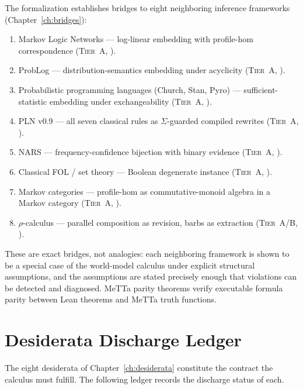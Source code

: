 The formalization establishes bridges to eight neighboring inference
frameworks (Chapter~\ref{ch:bridges}):
\begin{enumerate}
\item Markov Logic Networks --- log-linear embedding with profile-hom
  correspondence (\textsc{Tier~A}, \claimCore{}).
\item ProbLog --- distribution-semantics embedding under acyclicity
  (\textsc{Tier~A}, \claimConditional{}).
\item Probabilistic programming languages (Church, Stan, Pyro) ---
  sufficient-statistic embedding under exchangeability
  (\textsc{Tier~A}, \claimConditional{}).
\item PLN v0.9 --- all seven classical rules as $\Sigma$-guarded
  compiled rewrites (\textsc{Tier~A}, \claimConditional{}).
\item NARS --- frequency-confidence bijection with binary evidence
  (\textsc{Tier~A}, \claimCore{}).
\item Classical FOL / set theory --- Boolean degenerate instance
  (\textsc{Tier~A}, \claimCore{}).
\item Markov categories --- profile-hom as commutative-monoid algebra
  in a Markov category (\textsc{Tier~A}, \claimCore{}).
\item $\rho$-calculus --- parallel composition as revision, barbs as
  extraction (\textsc{Tier~A/B}, \claimCore{}).
\end{enumerate}

\noindent
These are exact bridges, not analogies: each neighboring framework is
shown to be a special case of the world-model calculus under explicit
structural assumptions, and the assumptions are stated precisely
enough that violations can be detected and diagnosed.  MeTTa parity
theorems verify executable formula parity between Lean theorems and
MeTTa truth functions.


\section{Desiderata Discharge Ledger}
\label{sec:covers-ledger}

The eight desiderata of Chapter~\ref{ch:desiderata} constitute the
contract the calculus must fulfill.  The following ledger records the
discharge status of each.

